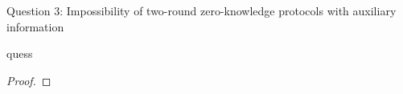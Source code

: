 \begin{solution}{Question 3: Impossibility of two-round zero-knowledge protocols with auxiliary information}\label{ques:1}
    \begin{question}
    quess
    \end{question}
    \tcblower{}
    \begin{proof}
    \end{proof}
\end{solution}
